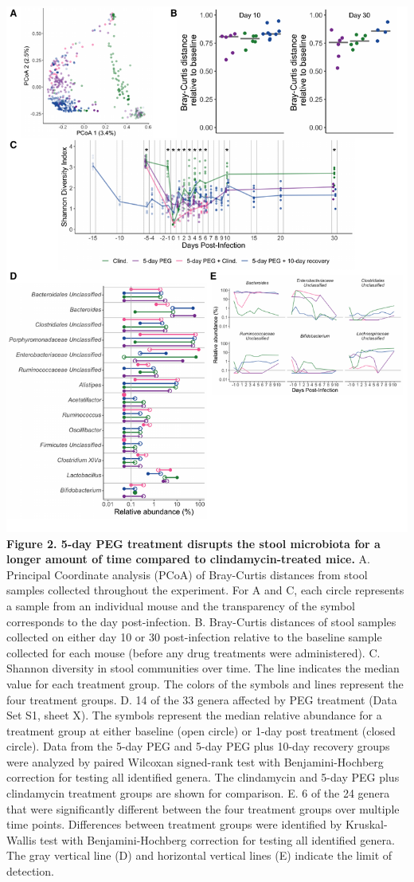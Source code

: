 \documentclass[
  11pt,
]{article}
\begin{document}
\includegraphics{figure_2.pdf} \textbf{Figure 2. 5-day PEG treatment
disrupts the stool microbiota for a longer amount of time compared to
clindamycin-treated mice.} A. Principal Coordinate analysis (PCoA) of
Bray-Curtis distances from stool samples collected throughout the
experiment. For A and C, each circle represents a sample from an
individual mouse and the transparency of the symbol corresponds to the
day post-infection. B. Bray-Curtis distances of stool samples collected
on either day 10 or 30 post-infection relative to the baseline sample
collected for each mouse (before any drug treatments were administered).
C. Shannon diversity in stool communities over time. The line indicates
the median value for each treatment group. The colors of the symbols and
lines represent the four treatment groups. D. 14 of the 33 genera
affected by PEG treatment (Data Set S1, sheet X). The symbols represent
the median relative abundance for a treatment group at either baseline
(open circle) or 1-day post treatment (closed circle). Data from the
5-day PEG and 5-day PEG plus 10-day recovery groups were analyzed by
paired Wilcoxan signed-rank test with Benjamini-Hochberg correction for
testing all identified genera. The clindamycin and 5-day PEG plus
clindamycin treatment groups are shown for comparison. E. 6 of the 24
genera that were significantly different between the four treatment
groups over multiple time points. Differences between treatment groups
were identified by Kruskal-Wallis test with Benjamini-Hochberg
correction for testing all identified genera. The gray vertical line (D)
and horizontal vertical lines (E) indicate the limit of detection.
\newpage
\end{document}
